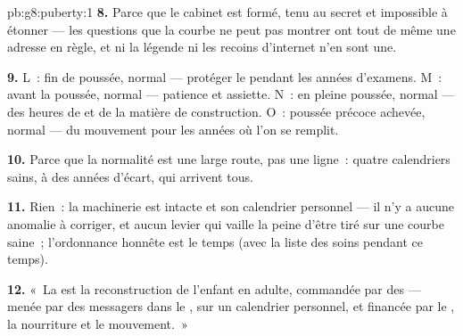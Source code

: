 \begin{solution}{pb:g8:puberty:1}
\textbf{8.} Parce que le cabinet est formé, tenu au secret et
impossible à étonner --- les questions que la courbe ne peut pas
montrer ont tout de même une adresse en règle, et ni la légende ni
les recoins d'internet n'en sont une.

\textbf{9.} L~: fin de poussée, normal --- protéger le 
pendant les années d'examens. M~: avant la poussée, normal ---
patience et assiette. N~: en pleine poussée, normal --- des heures
de  et de la matière de construction. O~: poussée précoce
achevée, normal --- du mouvement pour les années où l'on se remplit.

\textbf{10.} Parce que la normalité est une large route, pas une
ligne~: quatre calendriers sains, à des années d'écart, qui
arrivent tous.

\textbf{11.} Rien~: la machinerie est intacte et son calendrier
personnel --- il n'y a aucune anomalie à corriger, et aucun levier
qui vaille la peine d'être tiré sur une courbe saine~; l'ordonnance
honnête est le temps (avec la liste des soins pendant ce temps).

\textbf{12.} «~La  est la reconstruction de l'enfant en
adulte, commandée par des  --- menée par des messagers dans
le , sur un calendrier personnel, et financée par le , la
nourriture et le mouvement.~»
\end{solution}
